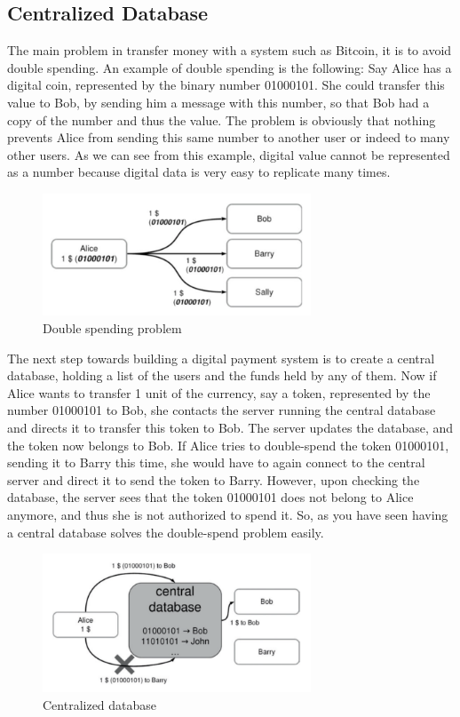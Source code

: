 \documentclass{article}
\begin{document}
\subsection*{Centralized Database}
The main problem in transfer money with a system such as Bitcoin, it is to avoid double spending.\newline
An example of double spending is the following: Say Alice has a digital coin, represented by the binary number 01000101. She could transfer this value to Bob, by sending him a message with this number, so that Bob had a copy of the number and thus the value. The problem is obviously that nothing prevents Alice from sending this same number to another user or indeed to many other users. As we can see from this example, digital value cannot be represented as a number because digital data is very easy to replicate many times.
\begin{figure}[H]
    \centering
    \includegraphics[width=8cm]{images/6.png}
    \caption{Double spending problem}
\end{figure}

\par\noindent The next step towards building a digital payment system is to create a central database, holding a list of the users and the funds held by any of them. Now if Alice wants to transfer 1 unit of the currency, say a token, represented by the number 01000101 to Bob, she contacts the server running the central database and directs it to transfer this token to Bob. The server updates the database, and the token now belongs to Bob. If Alice tries to double-spend the token 01000101, sending it to Barry this time, she would have to again connect to the central server and direct it to send the token to Barry. However, upon checking the database, the server sees that the token 01000101 does not belong to Alice anymore, and thus she is not authorized to spend it. So, as you have seen having a central database solves the double-spend problem easily.

\begin{figure}[H]
    \centering
    \includegraphics[width=8cm]{images/7.png}
    \caption{Centralized database}
\end{figure}
\end{document}
